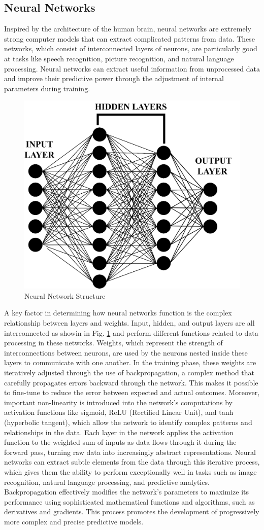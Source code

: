     \subsection{Neural Networks}
    Inspired by the architecture of the human brain, neural networks are extremely strong computer models that can extract complicated patterns from data. These networks, which consist of interconnected layers of neurons, are particularly good at tasks like speech recognition, picture recognition, and natural language processing. Neural networks can extract useful information from unprocessed data and improve their predictive power through the adjustment of internal parameters during training.
    \begin{figure}[H]
            \centering
            \includegraphics[width=0.6\linewidth]{Images/actor.png}
            \caption{Neural Network Structure}
            \label{fig:NN}
    \end{figure}
    A key factor in determining how neural networks function is the complex relationship between layers and weights. Input, hidden, and output layers are all interconnected as showin in Fig. \ref{fig:NN} and perform different functions related to data processing in these networks. Weights, which represent the strength of interconnections between neurons, are used by the neurons nested inside these layers to communicate with one another. In the training phase, these weights are iteratively adjusted through the use of backpropagation, a complex method that carefully propagates errors backward through the network. This makes it possible to fine-tune to reduce the error between expected and actual outcomes. Moreover, important non-linearity is introduced into the network's computations by activation functions like sigmoid, ReLU (Rectified Linear Unit), and tanh (hyperbolic tangent), which allow the network to identify complex patterns and relationships in the data. Each layer in the network applies the activation function to the weighted sum of inputs as data flows through it during the forward pass, turning raw data into increasingly abstract representations. Neural networks can extract subtle elements from the data through this iterative process, which gives them the ability to perform exceptionally well in tasks such as image recognition, natural language processing, and predictive analytics. Backpropagation effectively modifies the network's parameters to maximize its performance using sophisticated mathematical functions and algorithms, such as derivatives and gradients. This process promotes the development of progressively more complex and precise predictive models.
